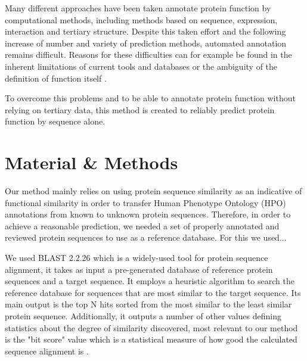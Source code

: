 \documentclass{bioinfo}
\begin{document}
Many different approaches have been taken annotate protein function by computational methods, including methods based on sequence, expression, interaction and tertiary structure. Despite this taken effort and the following increase of number and variety of prediction methods, automated annotation remains difficult. Reasons for these difficulties can for example be found in the inherent limitations of current tools and databases or the ambiguity of the definition of function itself \citep{Rodrigues07}.

To overcome this problems and to be able to annotate protein function without relying on tertiary data, this method is created to reliably predict protein function by sequence alone.

%

\section{Material \& Methods}

Our method mainly relies on using protein sequence similarity as an indicative of functional similarity in order to transfer Human Phenotype Ontology (HPO) annotations from known to unknown protein sequences. Therefore, in order to achieve a reasonable prediction, we needed a set of properly annotated and reviewed protein sequences to use as a reference database. For this we used...

We used BLAST 2.2.26 \cite{blastweb} which is a widely-used tool for protein sequence alignment, it takes as input a pre-generated database of reference protein sequences and a target sequence. It employs a heuristic algorithm to search the reference database for sequences that are most similar to the target sequence. Its main output is the top N hits sorted from the most similar to the least similar protein sequence. Additionally, it outputs a number of other values defining statistics about the degree of similarity discovered, most relevant to our method is the "bit score" value which is a statistical measure of how good the calculated sequence alignment is \cite{blastscore}.
\end{document}
